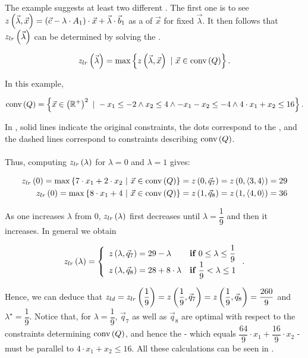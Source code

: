 The example suggests at least two different . The first one is to see $z\left( \vec{\lambda},\vec{x} \right)=\left( \vec{c}-\lambda\cdot A_1 \right)\cdot\vec{x}+\vec{\lambda}\cdot\vec{b}_1$ as a  of $\vec{x}$ for fixed $\vec{\lambda}$. It then follows that $z_{lr}\left( \vec{\lambda} \right)$ can be determined by solving the .

\begin{equation}
z_{lr}\left( \vec{\lambda} \right)=\max\left\{ z\left( \vec{\lambda},\vec{x} \right)\ |\ \vec{x}\in\mbox{conv}\left( Q \right) \right\}.
\end{equation}

In this example,

\begin{equation}
\mbox{conv}\left( Q \right)=\left\{ \vec{x}\in\left( \mathbb{R}^+ \right)^2\ |\ -x_1\leq-2\wedge x_2\leq4\wedge-x_1-x_2\leq-4\wedge4\cdot x_1+x_2\leq16 \right\}.
\end{equation}

In , solid lines indicate the original constraints, the dots correspond to the , and the dashed lines correspond to constraints describing $\mbox{conv}\left( Q \right)$.

\paragraph{}
Thus, computing $z_{lr}\left( \lambda \right)$ for $\lambda=0$ and $\lambda=1$ gives:

\begin{eqnarray}
z_{lr}\left( 0 \right)=\max\left\{ 7\cdot x_1+2\cdot x_2\ |\ \vec{x}\in\mbox{conv}\left( Q \right) \right\}=z\left( 0,\vec{q}_7 \right)=z\left( 0,\left\langle 3,4 \right\rangle \right)=29\\
z_{lr}\left( 0 \right)=\max\left\{ 8\cdot x_1+4\ |\ \vec{x}\in\mbox{conv}\left( Q \right) \right\}=z\left( 1,\vec{q}_8 \right)=z\left( 1,\left\langle 4,0 \right\rangle \right)=36
\end{eqnarray}

As one increases $\lambda$ from $0$, $z_{lr}\left( \lambda \right)$ first decreases until $\lambda=\dfrac{1}{9}$ and then it increases. In general we obtain


\begin{equation}
z_{lr}\left( \lambda \right)=\left\{\begin{array}{ll} z\left( \lambda,\vec{q}_7 \right)=29-\lambda&\mbox{\bf if }0\leq\lambda\leq\dfrac{1}{9}\\z\left( \lambda,\vec{q}_8 \right)=28+8\cdot\lambda&\mbox{\bf if }\dfrac{1}{9}<\lambda\leq1 \end{array}\right..
\end{equation}

Hence, we can deduce that $z_{ld}=z_{lr}\left( \dfrac{1}{9} \right)=z\left( \dfrac{1}{9},\vec{q}_7 \right)=z\left( \dfrac{1}{9},\vec{q}_8 \right)=\dfrac{260}{9}$ and $\lambda^{\star}=\dfrac{1}{9}$. Notice that, for $\lambda=\dfrac{1}{9}$, $\vec{q}_7$ as well as $\vec{q}_8$ are optimal with respect to the constraints determining $\mbox{conv}\left( Q \right)$, and hence the  - which equals $\dfrac{64}{9}\cdot x_1+\dfrac{16}{9}\cdot x_2$ - must be parallel to $4\cdot x_1+x_2\leq16$. All these calculations can be seen in .

